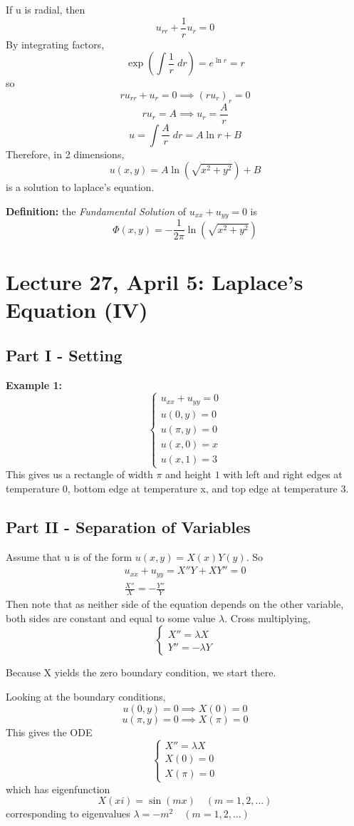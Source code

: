 \documentclass[12pt]{article}
\begin{document}
If u is radial, then 
\[u_{rr} + \frac{1}{r}u_r = 0\]
By integrating factors, 
\[\exp(\int \frac{1}{r}\; dr) = e^{\ln r} = r\]
so 
\[ru_{rr} + u_r = 0 \implies (ru_r)_r = 0\]
\[ru_r = A \implies u_r = \frac{A}{r}\]
\[u = \int \frac{A}{r} \; dr = A\ln r + B\]
Therefore, in 2 dimensions, 
\[\boxed{u(x, y) = A\ln(\sqrt{x^2 + y^2}) + B}\]
is a solution to laplace's equation.

\textbf{Definition:} the \emph{Fundamental Solution} of $u_{xx} + u_{yy} = 0$ is 
\[\boxed{\Phi(x, y) = -\frac{1}{2\pi} \ln(\sqrt{x^2 + y^2})}\]

\section*{Lecture 27, April 5: Laplace's Equation (IV)}
\subsection*{Part I - Setting}
\textbf{Example 1:} 
\[\begin{cases}
    u_{xx} + u_{yy} = 0\\
    u(0, y ) = 0\\
    u(\pi, y) = 0\\
    u(x, 0) = x\\
    u(x, 1) = 3
\end{cases}\]
This gives us a rectangle of width $\pi$ and height $1$ with left and right edges at temperature 0, bottom edge at temperature x, and top edge at temperature 3. 

\subsection*{Part II - Separation of Variables}
Assume that u is of the form $u(x, y) = X(x)Y(y)$. 
So 
\begin{gather*}
    u_{xx} + u_{yy} = X''Y + XY'' = 0\\
    \frac{X''}{X} = - \frac{Y''}{Y}
\end{gather*}
Then note that as neither side of the equation depends on the other variable, both sides are constant and equal to some value $\lambda$. Cross multiplying,
\[\begin{cases}
    X'' = \lambda X\\
    Y'' = -\lambda Y
\end{cases}\]

Because X yields the zero boundary condition, we start there. 

Looking at the boundary conditions, 
\[u(0, y) = 0 \implies X(0) = 0\]
\[u(\pi, y) = 0 \implies X(\pi) = 0\]
This gives the ODE 
\[\begin{cases}
    X'' = \lambda X\\
    X(0) = 0\\
    X(\pi) = 0
\end{cases}\]
which has eigenfunction 
\[X(xi) = \sin(mx) \quad (m = 1, 2, ...)\]
corresponding to eigenvalues $\lambda = -m^2 \quad (m=1, 2,...)$
\end{document}
